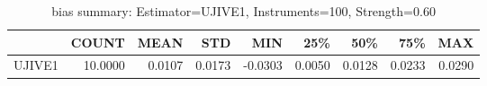 \begin{table}[ht]
\centering
\caption{bias summary: Estimator=UJIVE1, Instruments=100, Strength=0.60}
\begin{tabular}{lrrrrrrrr}
\toprule
 & COUNT & MEAN & STD & MIN & 25\% & 50\% & 75\% & MAX \\
\midrule
UJIVE1 & 10.0000 & 0.0107 & 0.0173 & -0.0303 & 0.0050 & 0.0128 & 0.0233 & 0.0290 \\
\bottomrule
\end{tabular}
\end{table}
